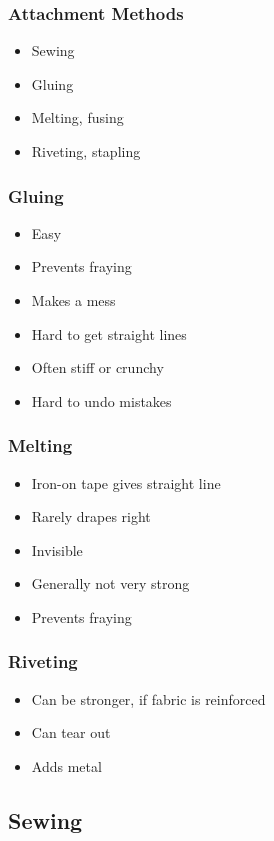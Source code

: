 \documentclass{beamer}
\begin{document}
\begin{frame}[fragile]
\frametitle{Attachment Methods}
\begin{itemize}
\item Sewing
\item Gluing
\item Melting, fusing
\item Riveting, stapling
\end{itemize}
\end{frame}

\begin{frame}[fragile]
\frametitle{Gluing}
\begin{itemize}
\item Easy
\item Prevents fraying
\item Makes a mess
\item Hard to get straight lines
\item Often stiff or crunchy
\item Hard to undo mistakes
\end{itemize}
\end{frame}

\begin{frame}[fragile]
\frametitle{Melting}
\begin{itemize}
\item Iron-on tape gives straight line
\item Rarely drapes right
\item Invisible
\item Generally not very strong
\item Prevents fraying
\end{itemize}
\end{frame}

\begin{frame}[fragile]
\frametitle{Riveting}
\begin{itemize}
\item Can be stronger, if fabric is reinforced
\item Can tear out
\item Adds metal
\end{itemize}
\end{frame}

\subsection{Sewing}

\begin{frame}[fragile]
\tableofcontents[currentsubsection]
\end{frame}
\end{document}
